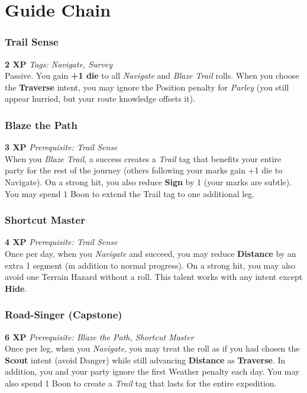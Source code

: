 \documentclass[11pt]{article}
\begin{document}
\section{Guide Chain}

\subsubsection{Trail Sense}
\textbf{2 XP} \hfill \textit{Tags: Navigate, Survey}\\
Passive. You gain \textbf{+1 die} to all \emph{Navigate} and \emph{Blaze Trail} rolls. When you choose the \textbf{Traverse} intent, you may ignore the Position penalty for \emph{Parley} (you still appear hurried, but your route knowledge offsets it).

\subsubsection{Blaze the Path}
\textbf{3 XP} \hfill \textit{Prerequisite: Trail Sense}\\
When you \emph{Blaze Trail}, a success creates a \emph{Trail} tag that benefits your entire party for the rest of the journey (others following your marks gain +1 die to Navigate). On a strong hit, you also reduce \textbf{Sign} by 1 (your marks are subtle). You may spend 1 Boon to extend the Trail tag to one additional leg.

\subsubsection{Shortcut Master}
\textbf{4 XP} \hfill \textit{Prerequisite: Trail Sense}\\
Once per day, when you \emph{Navigate} and succeed, you may reduce \textbf{Distance} by an extra 1 segment (in addition to normal progress). On a strong hit, you may also avoid one Terrain Hazard without a roll. This talent works with any intent except \textbf{Hide}.

\subsubsection{Road-Singer (Capstone)}
\textbf{6 XP} \hfill \textit{Prerequisite: Blaze the Path, Shortcut Master}\\
Once per leg, when you \emph{Navigate}, you may treat the roll as if you had chosen the \textbf{Scout} intent (avoid Danger) while still advancing \textbf{Distance} as \textbf{Traverse}. In addition, you and your party ignore the first Weather penalty each day. You may also spend 1 Boon to create a \emph{Trail} tag that lasts for the entire expedition.
\end{document}
